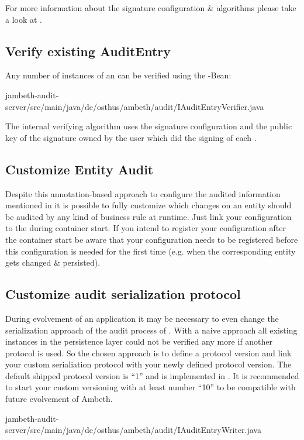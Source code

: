 For more information about the signature configuration \& algorithms please take a look at .

\subsection{Verify existing AuditEntry}
Any number of instances of an  can be verified using the -Bean:

	{jambeth-audit-server/src/main/java/de/osthus/ambeth/audit/IAuditEntryVerifier.java}

The internal verifying algorithm uses the signature configuration and the public key of the signature owned by the user which did the signing of each .

\subsection{Customize Entity Audit}
Despite this annotation-based approach to configure the audited information mentioned in  it is possible to fully customize which changes on an entity should be audited by any kind of business rule at runtime. Just link your configuration to the  during container start. If you intend to register your configuration after the container start be aware that your configuration needs to be registered before this configuration is needed for the first time (e.g. when the corresponding entity gets changed \& persisted).

\subsection{Customize audit serialization protocol}
During evolvement of an application it may be necessary to even change the serialization approach of the audit process of . With a naive approach all existing  instances in the persistence layer could not be verified any more if another protocol is used. So the chosen approach is to define a protocol version and link your custom serialiation protocol with your newly defined protocol version. The default shipped protocol version is ``1'' and is implemented in . It is recommended to start your custom versioning with at least number ``10'' to be compatible with future evolvement of Ambeth.

	{jambeth-audit-server/src/main/java/de/osthus/ambeth/audit/IAuditEntryWriter.java}